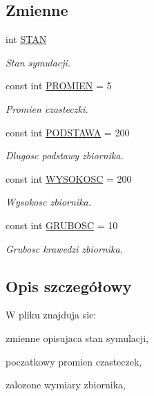 \subsection*{Zmienne}
\begin{DoxyCompactItemize}
\item 
int \hyperlink{flagi_8hh_ae3a120c63186a17e4127a68187b3e9e8}{S\-T\-A\-N}
\begin{DoxyCompactList}\small\item\em Stan symulacji. \end{DoxyCompactList}\item 
const int \hyperlink{flagi_8hh_aa77f856f3142a9e81752665a9bc2e6de}{P\-R\-O\-M\-I\-E\-N} = 5
\begin{DoxyCompactList}\small\item\em Promien czasteczki. \end{DoxyCompactList}\item 
const int \hyperlink{flagi_8hh_acd3c5814c051e565bf7854f6403acf49}{P\-O\-D\-S\-T\-A\-W\-A} = 200
\begin{DoxyCompactList}\small\item\em Dlugosc podstawy zbiornika. \end{DoxyCompactList}\item 
const int \hyperlink{flagi_8hh_a073767f0ac7dbf009a42b00de1092b52}{W\-Y\-S\-O\-K\-O\-S\-C} = 200
\begin{DoxyCompactList}\small\item\em Wysokosc zbiornika. \end{DoxyCompactList}\item 
const int \hyperlink{flagi_8hh_a359a95636f17b8e9b7a01389d75b521d}{G\-R\-U\-B\-O\-S\-C} = 10
\begin{DoxyCompactList}\small\item\em Grubosc krawedzi zbiornika. \end{DoxyCompactList}\end{DoxyCompactItemize}


\subsection{Opis szczegółowy}
W pliku znajduja sie\-:
\begin{DoxyItemize}
\item zmienne opisujaca stan symulacji,
\item poczatkowy promien czasteczek,
\item zalozone wymiary zbiornika, 
\end{DoxyItemize}

